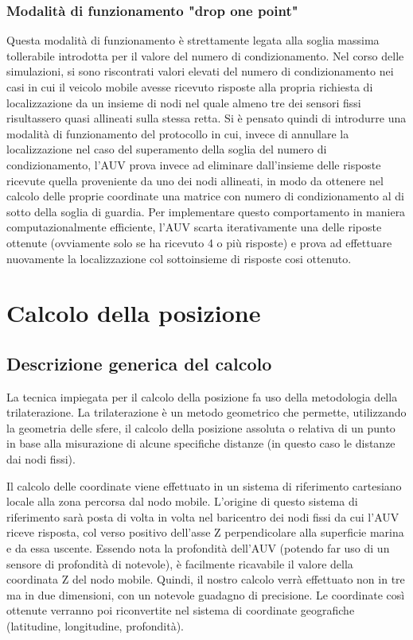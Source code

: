 \documentclass[Lau,binding=0.6cm]{sapthesis}
\begin{document}
\subsubsection{Modalità di funzionamento "drop one point"}
\par
Questa modalità di funzionamento è strettamente legata alla soglia massima tollerabile introdotta per il valore del numero di condizionamento. Nel corso delle simulazioni, si sono riscontrati valori elevati del numero di condizionamento nei casi in cui il veicolo mobile avesse ricevuto risposte alla propria richiesta di localizzazione da un insieme di nodi nel quale almeno tre dei sensori fissi risultassero quasi allineati sulla stessa retta. Si è pensato quindi di introdurre una modalità di funzionamento del protocollo in cui, invece di annullare la localizzazione nel caso del superamento della soglia del numero di condizionamento, l'AUV prova invece ad eliminare dall'insieme delle risposte ricevute quella proveniente da uno dei nodi allineati, in modo da ottenere nel calcolo delle proprie coordinate una matrice con numero di condizionamento al di sotto della soglia di guardia. Per implementare questo comportamento in maniera computazionalmente efficiente, l'AUV scarta iterativamente una delle riposte ottenute (ovviamente solo se ha ricevuto 4 o più risposte) e prova ad effettuare nuovamente la localizzazione col sottoinsieme di risposte cosi ottenuto.
\par


\section{Calcolo della posizione}

\subsection{Descrizione generica del calcolo}
La tecnica impiegata per il calcolo della posizione fa uso della metodologia della trilaterazione. La trilaterazione è un metodo geometrico che permette, utilizzando la geometria delle sfere, il calcolo della posizione assoluta o relativa di un punto in base alla misurazione di alcune specifiche distanze (in questo caso le distanze dai nodi fissi).\newline

Il calcolo delle coordinate viene effettuato in un sistema di riferimento cartesiano locale alla zona percorsa dal nodo mobile. L'origine di questo sistema di riferimento sarà posta di volta in volta nel baricentro dei nodi fissi da cui l'AUV riceve risposta, col verso positivo dell'asse Z perpendicolare alla superficie marina e da essa uscente. 
Essendo nota la profondità dell'AUV (potendo far uso di un sensore di profondità di notevole), è facilmente ricavabile il valore  della coordinata Z del nodo mobile.
Quindi, il nostro calcolo verrà effettuato non in tre ma in due dimensioni, con un notevole guadagno di precisione.
Le coordinate così ottenute verranno poi riconvertite nel sistema di coordinate geografiche (latitudine, longitudine, profondità).
\end{document}
